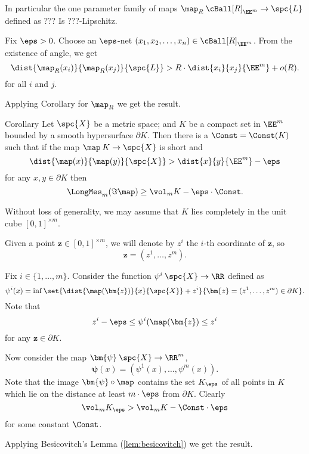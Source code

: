 In particular the one parameter family of maps 
$\map_R\:\cBall[R]_{\EE^m}\to \spc{L}$ defined as
???
Is ???-Lipschitz.

Fix $\eps>0$.
Choose an $\eps$-net $(x_1,x_2,\dots,x_n)\in \cBall[R]_{\EE^m}$.
From the existence of angle, we get
$$\dist{\map_R(x_i)}{\map_R(x_j)}{\spc{L}}
>
R\cdot\dist{x_i}{x_j}{\EE^m}+o(R).
$$
for all $i$ and $j$.

Applying Corollary for $\map_R$ we get the result.
\qeds




















\begin{thm}{Corollary}
Let $\spc{X}$ be a metric space;
and $K$ be a compact set in $\EE^m$ 
bounded by a smooth hypersurface $\partial K$.
Then there is a $\Const=\Const(K)$ such that
if the map
$\map\:K\to\spc{X}$ is short 
and
\[\dist{\map(x)}{\map(y)}{\spc{X}}>\dist{x}{y}{\EE^m}-\eps\]
for any $x,y\in \partial K$
then 
$$\LongMes_m(\Im\map) \ge \vol_m K
-
\eps\cdot\Const.$$

\end{thm}

Without loss of generality,
we may assume that $K$ lies completely in the unit cube
$[0,1]^{\times m}$.

Given a point $\bm{z}\in [0,1]^{\times m}$,
we will denote by $z^i$ the $i$-th coordinate of $\bm{z}$,
so 
\[\bm{z}=(z^1,\dots,z^m).\]

Fix $i\in\{1,\dots,m\}$.
Consider the function 
$\psi^i\:\spc{X}\to \RR$
defined as 
\[
\psi^i(x)
=
\inf
\set{\dist{\map(\bm{z})}{x}{\spc{X}}+z^i}{\bm{z}=(z^1,\dots,z^m)\in\partial K}.
\]
Note that 
\[z^i-\eps \le \psi^i(\map(\bm{z})\le  z^i\]
for any $\bm{z}\in\partial K$. 

Now consider the map $\bm{\psi}\:\spc{X}\to \RR^m$,
\[\bm{\psi}(x)=(\psi^1(x),\dots,\psi^m(x)).\]
Note that the image $\bm{\psi}\circ\map$
contains the set $K_\eps$ of all points in $K$ 
which lie on the distance at least $m\cdot\eps$ from $\partial K$.
Clearly 
\[\vol_m K_\eps>\vol_m K-\Const\cdot\eps\]
for some constant $\Const$.

Applying Besicovitch's Lemma (\ref{lem:besicovitch}) we get the result.
\qeds
















